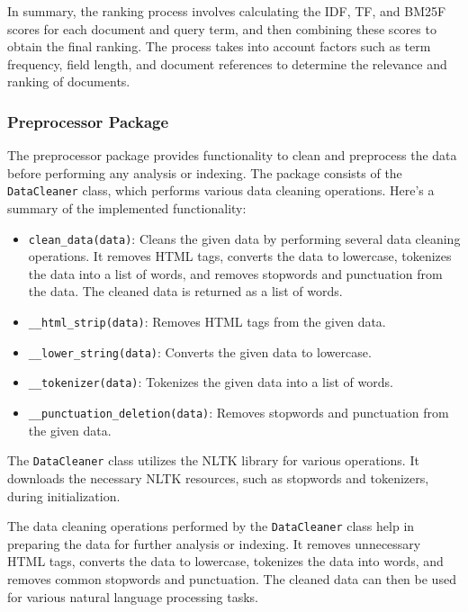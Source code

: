 \documentclass{article}
\begin{document}
In summary, the ranking process involves calculating the IDF, TF, and BM25F
scores for each 
document and query term, and then combining these scores to obtain the final ranking. The 
process takes into account factors such as term frequency, field length, and document references 
to determine the relevance and ranking of documents.

\subsubsection{Preprocessor Package}

The preprocessor package provides functionality to clean and preprocess the data before 
performing any analysis or indexing. The package consists of the \texttt{DataCleaner} class, 
which performs various data cleaning operations. Here's a summary of the implemented 
functionality:

\begin{itemize}
    \item \texttt{clean\_data(data)}: Cleans the given data by performing several data cleaning 
    operations. It removes HTML tags, converts the data to lowercase, tokenizes the data into a 
    list of words, and removes stopwords and punctuation from the data. The cleaned data is 
    returned as a list of words.
    \item \texttt{\_\_html\_strip(data)}: Removes HTML tags from the given data.
    \item \texttt{\_\_lower\_string(data)}: Converts the given data to lowercase.
    \item \texttt{\_\_tokenizer(data)}: Tokenizes the given data into a list of words.
    \item \texttt{\_\_punctuation\_deletion(data)}: Removes stopwords and punctuation from the 
    given data.
\end{itemize}

The \texttt{DataCleaner} class utilizes the NLTK library for various operations. It downloads 
the necessary NLTK resources, such as stopwords and tokenizers, during initialization.

The data cleaning operations performed by the \texttt{DataCleaner} class help in preparing the 
data for further analysis or indexing. It removes unnecessary HTML tags, converts the data to 
lowercase, tokenizes the data into words, and removes common stopwords and punctuation. The 
cleaned data can then be used for various natural language processing tasks.
\end{document}
